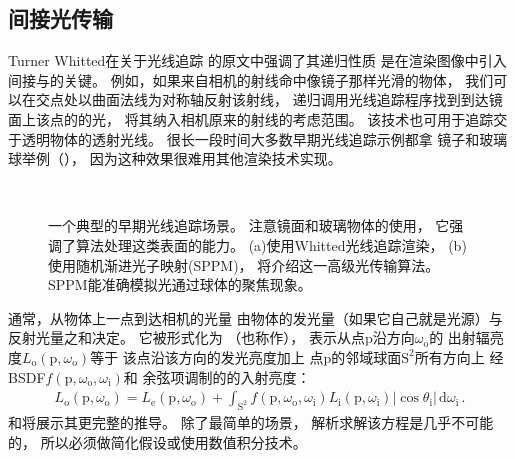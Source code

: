 \subsection{间接光传输}\label{sub:间接光传输}

Turner Whitted在关于光线追踪
的原文中\citep{10.1145/358876.358882}强调了其递归性质
是在渲染图像中引入间接与的关键。
例如，如果来自相机的射线命中像镜子那样光滑的物体，
我们可以在交点处以曲面法线为对称轴反射该射线，
递归调用光线追踪程序找到到达镜面上该点的的光，
将其纳入相机原来的射线的考虑范围。
该技术也可用于追踪交于透明物体的透射光线。
很长一段时间大多数早期光线追踪示例都拿
镜子和玻璃球举例（），
因为这种效果很难用其他渲染技术实现。
\begin{figure}
      \centering
      \\
      \caption{一个典型的早期光线追踪场景。
            注意镜面和玻璃物体的使用，
            它强调了算法处理这类表面的能力。
            (a)使用Whitted光线追踪渲染，
            (b)使用随机渐进光子映射(SPPM)，
            将介绍这一高级光传输算法。
            SPPM能准确模拟光通过球体的聚焦现象。}\label{fig:1.7}
\end{figure}

通常，从物体上一点到达相机的光量
由物体的发光量（如果它自己就是光源）与反射光量之和决定。
它被形式化为
（也称作），
表示从点p沿方向$\omega_\mathrm{o}$的
出射辐亮度$L_{\mathrm{o}}(\mathrm{p},\omega_\mathrm{o})$等于
该点沿该方向的发光亮度加上
点p的邻域球面$\mathrm{S}^2$所有方向上
经BSDF$f(\mathrm{p},\omega_\mathrm{o},\omega_\mathrm{i})$和
余弦项调制的的入射亮度：
\begin{align}
      L_{\mathrm{o}}(\mathrm{p},\omega_\mathrm{o})=L_{\mathrm{e}}(\mathrm{p},\omega_\mathrm{o})+\int_{\mathrm{S}^2}f(\mathrm{p},\omega_\mathrm{o},\omega_\mathrm{i})L_{\mathrm{i}}(\mathrm{p},\omega_\mathrm{i})|\cos{\theta_{\mathrm{i}}}| \,\mathrm{d}\omega_\mathrm{i}\, .
\end{align}
和将展示其更完整的推导。
除了最简单的场景，
解析求解该方程是几乎不可能的，
所以必须做简化假设或使用数值积分技术。

